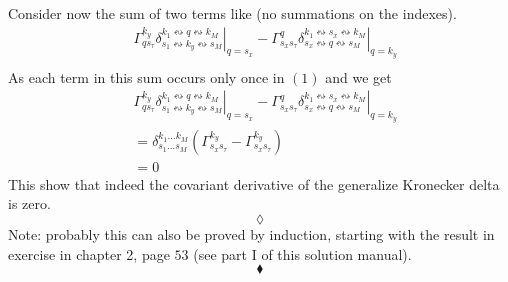 Consider now the sum of two terms like (no summations on the indexes).
\begin{align}
& \left.\Gamma^{k_y}_{q s_{\tau}}\delta^{k_1 \leftrightsquigarrow q\leftrightsquigarrow  k_M}_{s_1 \leftrightsquigarrow k_y\leftrightsquigarrow s_M}\right|_{q=  s_x}-\left.\Gamma^{q}_{ s_x s_{\tau}}\delta^{k_1 \leftrightsquigarrow s_x\leftrightsquigarrow  k_M}_{s_x \leftrightsquigarrow q \leftrightsquigarrow s_M}\right|_{q= k_y}\\
\end{align}
 As each term in this sum occurs only once in $(1)$ and  we get 
\begin{align}
& \left.\Gamma^{k_y}_{q s_{\tau}}\delta^{k_1 \leftrightsquigarrow q\leftrightsquigarrow  k_M}_{s_1 \leftrightsquigarrow k_y\leftrightsquigarrow s_M}\right|_{q=  s_x}-\left.\Gamma^{q}_{ s_x s_{\tau}}\delta^{k_1 \leftrightsquigarrow s_x\leftrightsquigarrow  k_M}_{s_x \leftrightsquigarrow q \leftrightsquigarrow s_M}\right|_{q= k_y}\\
&= \delta^{k_1 \dots k_M}_{s_1 \dots s_M}\left(\Gamma^{k_y}_{s_x s_{\tau}}-\Gamma^{k_y}_{ s_x s_{\tau}}\right)\\
&=0
\end{align}
This show that indeed the covariant derivative of the generalize Kronecker delta is zero.
$$\lozenge$$
Note: probably this can also be proved by induction, starting with the result in exercise in chapter 2, page $53$ (see part I of this solution manual).
$$\blacklozenge$$
\newpage



